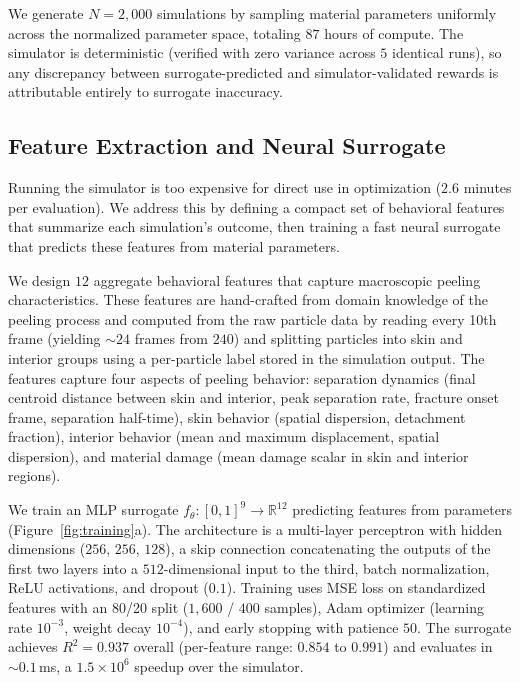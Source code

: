 We generate $N = 2{,}000$ simulations by sampling material parameters uniformly across the normalized parameter space, totaling $87$ hours of compute. The simulator is deterministic (verified with zero variance across $5$ identical runs), so any discrepancy between surrogate-predicted and simulator-validated rewards is attributable entirely to surrogate inaccuracy.

\subsection{Feature Extraction and Neural Surrogate}
\label{sec:surrogate}
Running the simulator is too expensive for direct use in optimization ($2.6$ minutes per evaluation). We address this by defining a compact set of behavioral features that summarize each simulation's outcome, then training a fast neural surrogate that predicts these features from material parameters.


We design $12$ aggregate behavioral features that capture macroscopic peeling characteristics. These features are hand-crafted from domain knowledge of the peeling process and computed from the raw particle data by reading every 10th frame (yielding ${\sim}24$ frames from $240$) and splitting particles into skin and interior groups using a per-particle label stored in the simulation output. The features capture four aspects of peeling behavior: separation dynamics (final centroid distance between skin and interior, peak separation rate, fracture onset frame, separation half-time), skin behavior (spatial dispersion, detachment fraction), interior behavior (mean and maximum displacement, spatial dispersion), and material damage (mean damage scalar in skin and interior regions).

We train an MLP surrogate $f_\theta: [0,1]^9 \to \mathbb{R}^{12}$ predicting features from parameters (Figure~\ref{fig:training}a). The architecture is a multi-layer perceptron with hidden dimensions ($256$, $256$, $128$), a skip connection concatenating the outputs of the first two layers into a $512$-dimensional input to the third, batch normalization, ReLU activations, and dropout ($0.1$). Training uses MSE loss on standardized features with an 80/20 split ($1{,}600$ / $400$ samples), Adam optimizer (learning rate $10^{-3}$, weight decay $10^{-4}$), and early stopping with patience $50$. The surrogate achieves $R^2 = 0.937$ overall (per-feature range: $0.854$ to $0.991$) and evaluates in ${\sim}0.1$\,ms, a $1.5 \times 10^6$ speedup over the simulator.

